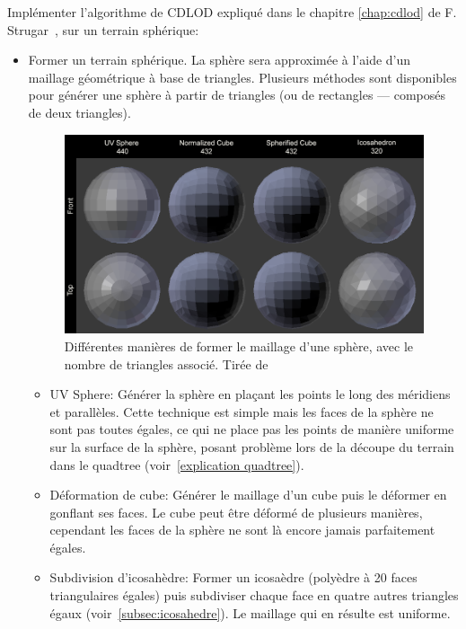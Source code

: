 Implémenter l'algorithme de CDLOD expliqué dans le chapitre \ref{chap:cdlod} de F.
Strugar~\cite{CDLOD}, sur un terrain sphérique:\\
\begin{itemize}
\item 
  Former un terrain sphérique. La sphère sera approximée à l'aide d'un
    maillage géométrique à base de triangles. Plusieurs méthodes sont
    disponibles pour générer une sphère à partir de triangles (ou de
    rectangles --- composés de deux triangles).


  \begin{figure}[!ht]
  \centerline{
    \includegraphics[width=12cm]{img/spheres.png}}
     \caption[Sphère génération]{Différentes manières de former le maillage d'une sphère, avec le nombre de triangles associé. Tirée de\protect\footnotemark}
    \label{fig:spheres}
    \end{figure}
  

  \begin{itemize}
  \item
    UV Sphere: Générer la sphère en plaçant les points le long des
      méridiens et parallèles. Cette technique est simple mais les faces
      de la sphère ne sont pas toutes égales, ce qui ne place pas les
      points de manière uniforme sur la surface de la sphère, posant
      problème lors de la découpe du terrain dans le quadtree
      (voir~\ref{explication quadtree}).
  \item
    Déformation de cube: Générer le maillage d'un cube puis le déformer en
      gonflant ses faces. Le cube peut être déformé de plusieurs manières,
      cependant les faces de la sphère ne sont là encore jamais
      parfaitement égales.
  \item
    Subdivision d'icosahèdre: Former un icosaèdre (polyèdre à 20 faces
      triangulaires égales) puis subdiviser chaque face en quatre autres
      triangles égaux (voir~\ref{subsec:icosahedre}). Le maillage qui en
      résulte est uniforme.
  \end{itemize}


\end{itemize}
